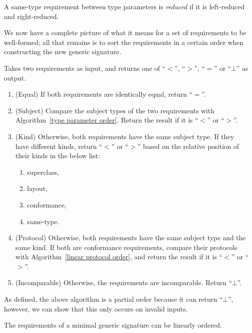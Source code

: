 \documentclass[../generics]{subfiles}
\begin{document}
\begin{definition}
A same-type requirement between type parameters is \emph{reduced} if it is left-reduced and right-reduced.
\end{definition}
We now have a complete picture of what it means for a set of requirements to be well-formed; all that remains is to sort the requirements in a certain order when constructing the new generic signature.
\begin{algorithm}\label{requirement order}
 Takes two requirements as input, and returns one of ``$<$'', ``$>$'', ``$=$'' or \index{$\bot$}``$\bot$'' as output.
\begin{enumerate}
\item (Equal) If both requirements are identically equal, return ``$=$''.
\item (Subject) Compare the subject types of the two requirements with Algorithm~\ref{type parameter order}. Return the result if it is ``$<$'' or ``$>$''.
\item (Kind) Otherwise, both requirements have the same subject type. If they have different kinds, return ``$<$'' or ``$>$'' based on the relative position of their kinds in the below list:
\begin{enumerate}
\item superclass,
\item layout,
\item conformance,
\item same-type.
\end{enumerate}
\item (Protocol) Otherwise, both requirements have the same subject type and the same kind. If both are conformance requirements, compare their protocols with Algorithm~\ref{linear protocol order}, and return the result if it is ``$<$'' or ``$>$''.
\item (Incomparable) Otherwise, the requirements are incomparable. Return ``$\bot$''.
\end{enumerate}
\end{algorithm}
As defined, the above algorithm is a partial order because it can return ``$\bot$'', however, we can show that this only occurs on invalid inputs.
\begin{proposition}
The requirements of a minimal generic signature can be linearly ordered.
\end{proposition}
\end{document}
